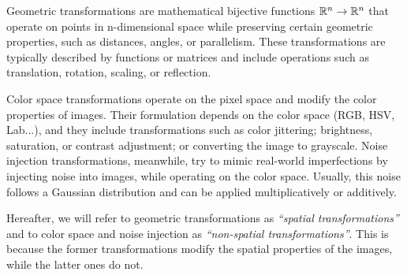 Geometric transformations are mathematical bijective functions $\mathbb{R}^n \rightarrow \mathbb{R}^n$ that operate on points in n-dimensional space while preserving certain geometric properties, such as distances, angles, or parallelism. These transformations are typically described by functions or matrices and include operations such as translation, rotation, scaling, or reflection.

Color space transformations operate on the pixel space and modify the color properties of images. Their formulation depends on the color space (RGB, HSV, Lab...), and they include transformations such as color jittering; brightness, saturation, or contrast adjustment; or converting the image to grayscale. Noise injection transformations, meanwhile, try to mimic real-world imperfections by injecting noise into images, while operating on the color space. Usually, this noise follows a Gaussian distribution and can be applied multiplicatively or additively.

Hereafter, we will refer to geometric transformations as \textit{``spatial transformations''} and to color space and noise injection as \textit{``non-spatial transformations''}. This is because the former transformations modify the spatial properties of the images, while the latter ones do not.

